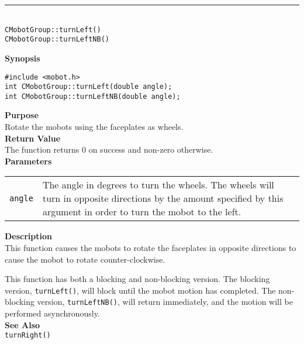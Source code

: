 \noindent
\vspace{5pt}
\rule{4.5in}{0.015in}\\
\noindent
{\LARGE \texttt{CMobotGroup::turnLeft()}}\\
{\LARGE \texttt{CMobotGroup::turnLeftNB()}}\\
{}

\noindent
{\bf Synopsis}
\vspace{-8pt}
\begin{verbatim}
#include <mobot.h>
int CMobotGroup::turnLeft(double angle);
int CMobotGroup::turnLeftNB(double angle);
\end{verbatim}

\noindent
{\bf Purpose}\\
Rotate the mobots using the faceplates as wheels.\\

\noindent
{\bf Return Value}\\
The function returns 0 on success and non-zero otherwise.\\

\noindent
{\bf Parameters}\\
\vspace{-0.1in}
\begin{description}
\item               
\begin{tabular}{p{10 mm}p{145 mm}}
\texttt{angle} & The angle in degrees to turn the wheels. The wheels will turn in opposite directions by the amount specified by this argument in order to turn the mobot to the left. \\
\end{tabular}
\end{description}

\noindent
{\bf Description}\\
This function causes the mobots to rotate the faceplates in opposite directions
to cause the mobot to rotate counter-clockwise.

This function has both a blocking and non-blocking version.
The blocking version, \texttt{turnLeft()}, will block until the
mobot motion has completed. The non-blocking version, \texttt{turnLeftNB()},
will return immediately, and the motion will be performed asynchronously.\\


\noindent
{\bf See Also}\\
\texttt{turnRight()}

